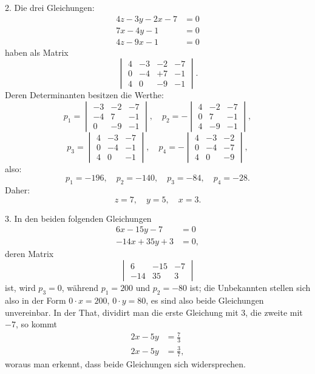 2. Die drei Gleichungen:
\[
\begin{aligned}
4z-3y-2x-7&=0\\
7x-4y-1&=0\\
4z-9x-1&=0
\end{aligned}
\]
haben als Matrix
\[
\begin{vmatrix}
4 & -3 & -2 & -7\\
0 & -4 & +7 & -1\\
4 & 0 & -9 & -1
\end{vmatrix}.
\]
Deren Determinanten besitzen die Werthe:
\[
p_1=\begin{vmatrix} -3 & -2 & -7\\ -4 & 7 & -1\\ 0 & -9 & -1 \end{vmatrix},
\quad
p_2=-\begin{vmatrix} 4 & -2 & -7\\ 0 & 7 & -1\\ 4 & -9 & -1 \end{vmatrix},
\]
\[
p_3=\begin{vmatrix} 4 & -3 & -7\\ 0 & -4 & -1\\ 4 & 0 & -1 \end{vmatrix},
\quad
p_4=-\begin{vmatrix} 4 & -3 & -2\\ 0 & -4 & -7\\ 4 & 0 & -9 \end{vmatrix},
\]
also:
\[
p_1=-196,\quad p_2=-140,\quad p_3=-84,\quad p_4=-28.
\]
Daher:
\[
z=7,\quad y=5,\quad x=3.
\]

3. In den beiden folgenden Gleichungen
\[
\begin{aligned}
6x-15y-7&=0\\
-14x+35y+3&=0,
\end{aligned}
\]
deren Matrix
\[
\begin{vmatrix}
6 & -15 & -7\\
-14 & 35 & 3
\end{vmatrix}
\]
ist, wird $p_3=0$, während $p_1=200$ und $p_2=-80$ ist; die Unbekannten stellen sich also in der Form $0\cdot x=200$, $0\cdot y=80$, es sind also beide Gleichungen unvereinbar. In der That, dividirt man die erste Gleichung mit 3, die zweite mit $-7$, so kommt
\[
\begin{aligned}
2x-5y&=\frac{7}{3}\\
2x-5y&=\frac{3}{7},
\end{aligned}
\]
woraus man erkennt, dass beide Gleichungen sich widersprechen.

